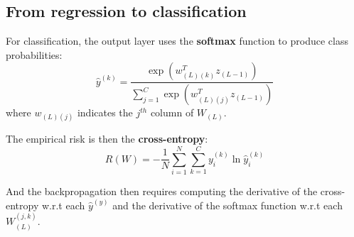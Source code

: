 \subsection{From regression to classification}
For classification, the output layer uses the \textbf{softmax} function 
to produce class probabilities:
\[
  \hat{y}^{(k)} = \frac{\exp\!\left(w_{(L)(k)}^T z_{(L-1)}\right)}
  {\sum_{j=1}^{C} \exp\!\left(w_{(L)(j)}^T z_{(L-1)}\right)}
\] where $w_{(L)(j)}$ indicates the $j^{th}$ column of $W_{(L)}$. 

The empirical risk is then the \textbf{cross-entropy}:
\[
  R(W) = -\frac{1}{N} \sum_{i=1}^{N} \sum_{k=1}^{C} y_i^{(k)} \ln \hat{y}_i^{(k)}
\]

And the backpropagation then requires computing the derivative of
the cross-entropy w.r.t each $\hat{y}^{(y)}$ and the derivative of the softmax function w.r.t each $W_{(L)}^{(j,k)}$.
